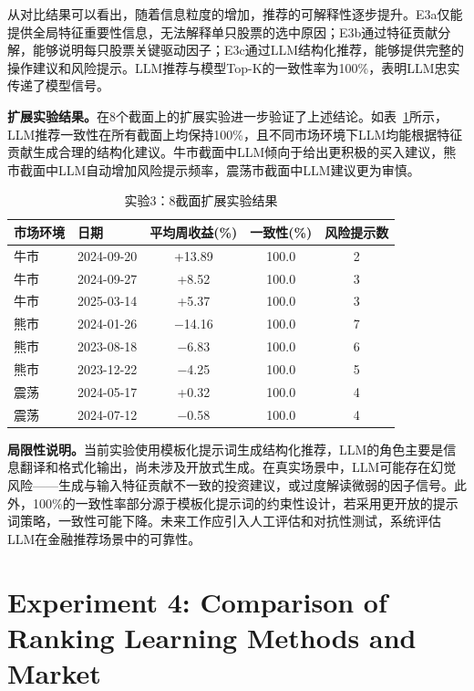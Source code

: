 \documentclass[11pt,a4paper]{ctexart}
\begin{document}
从对比结果可以看出，随着信息粒度的增加，推荐的可解释性逐步提升。E3a仅能提供全局特征重要性信息，无法解释单只股票的选中原因；E3b通过特征贡献分解，能够说明每只股票关键驱动因子；E3c通过LLM结构化推荐，能够提供完整的操作建议和风险提示。LLM推荐与模型Top-K的一致性率为100\%，表明LLM忠实传递了模型信号。

\textbf{扩展实验结果。}在8个截面上的扩展实验进一步验证了上述结论。如表~\ref{tab:exp3-expanded}所示，LLM推荐一致性在所有截面上均保持100\%，且不同市场环境下LLM均能根据特征贡献生成合理的结构化建议。牛市截面中LLM倾向于给出更积极的买入建议，熊市截面中LLM自动增加风险提示频率，震荡市截面中LLM建议更为审慎。

\begin{table}[htbp]
\centering
\caption{实验3：8截面扩展实验结果}
\label{tab:exp3-expanded}
\begin{tabular}{llccc}
\toprule
\textbf{市场环境} & \textbf{日期} & \textbf{平均周收益(\%)} & \textbf{一致性(\%)} & \textbf{风险提示数} \\
\midrule
牛市 & 2024-09-20 & +13.89 & 100.0 & 2 \\
牛市 & 2024-09-27 & +8.52 & 100.0 & 3 \\
牛市 & 2025-03-14 & +5.37 & 100.0 & 3 \\
熊市 & 2024-01-26 & $-$14.16 & 100.0 & 7 \\
熊市 & 2023-08-18 & $-$6.83 & 100.0 & 6 \\
熊市 & 2023-12-22 & $-$4.25 & 100.0 & 5 \\
震荡 & 2024-05-17 & +0.32 & 100.0 & 4 \\
震荡 & 2024-07-12 & $-$0.58 & 100.0 & 4 \\
\bottomrule
\end{tabular}
\end{table}

\textbf{局限性说明。}当前实验使用模板化提示词生成结构化推荐，LLM的角色主要是信息翻译和格式化输出，尚未涉及开放式生成。在真实场景中，LLM可能存在幻觉风险——生成与输入特征贡献不一致的投资建议，或过度解读微弱的因子信号。此外，100\%的一致性率部分源于模板化提示词的约束性设计，若采用更开放的提示词策略，一致性可能下降。未来工作应引入人工评估和对抗性测试，系统评估LLM在金融推荐场景中的可靠性。

\section{Experiment 4: Comparison of Ranking Learning Methods and Market }
\end{document}
